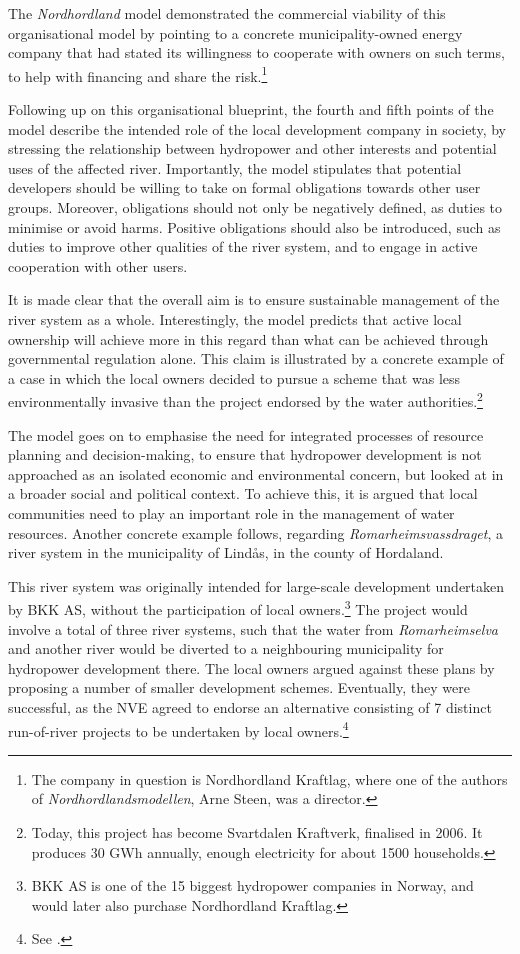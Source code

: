 The {\it Nordhordland} model demonstrated the commercial viability of this organisational model by pointing to a concrete municipality-owned energy company that had stated its willingness to cooperate with owners on such terms, to help with financing and share the risk.\footnote{The company in question is Nordhordland Kraftlag, where one of the authors of {\it Nordhordlandsmodellen}, Arne Steen, was a director.} 

Following up on this organisational blueprint, the fourth and fifth points of the model describe the intended role of the local development company in society, by stressing the relationship between hydropower and other interests and potential uses of the affected river. Importantly, the model stipulates that potential developers should be willing to take on formal obligations towards other user groups. Moreover, obligations should not only be negatively defined, as duties to minimise or avoid harms. Positive obligations should also be introduced, such as duties to improve other qualities of the river system, and to engage in active cooperation with other users.

It is made clear that the overall aim is to ensure sustainable management of the river system as a whole. Interestingly, the model predicts that active local ownership will achieve more in this regard than what can be achieved through governmental regulation alone. This claim is illustrated by a concrete example of a case in which the local owners decided to pursue a scheme that was less environmentally invasive than the project endorsed by the water authorities.\footnote{Today, this project has become Svartdalen Kraftverk, finalised in 2006. It produces 30 GWh annually, enough electricity for about 1500 households.}

The model goes on to emphasise the need for integrated processes of resource planning and decision-making, to ensure that hydropower development is not approached as an isolated economic and environmental concern, but looked at in a broader social and political context. To achieve this, it is argued that local communities need to play an important role in the management of water resources. Another concrete example follows, regarding {\it Romarheimsvassdraget}, a river system in the municipality of Lindås, in the county of Hordaland.

This river system was originally intended for large-scale development undertaken by BKK AS, without the participation of local owners.\footnote{BKK AS is one of the 15 biggest hydropower companies in Norway, and would later also purchase Nordhordland Kraftlag.} The project would involve a total of three river systems, such that the water from {\it Romarheimselva} and another river would be diverted to a neighbouring municipality for hydropower development there. The local owners argued against these plans by proposing a number of smaller development schemes. Eventually, they were successful, as the NVE agreed to endorse an alternative consisting of 7 distinct run-of-river projects to be undertaken by local owners.\footnote{See \cite{vann25}.}

